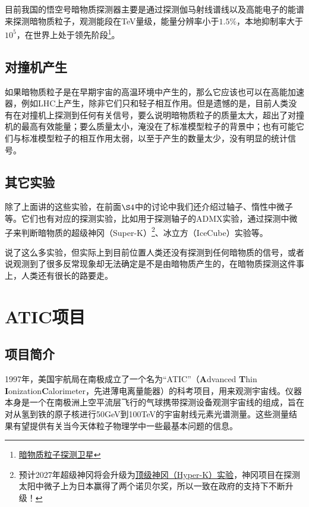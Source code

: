 \documentclass{ctexart}
\begin{document}
	目前我国的悟空号暗物质探测器主要是通过探测伽马射线谱线以及高能电子的能谱来探测暗物质粒子，观测能段在TeV量级，能量分辨率小于$1.5\%$，本地抑制率大于$10^5$，在世界上处于领先阶段\footnote{\href{http://pmo.cas.cn/dampe/}{暗物质粒子探测卫星}}。
	
	\subsection{对撞机产生}
	如果暗物质粒子是在早期宇宙的高温环境中产生的，那么它应该也可以在高能加速器，例如LHC上产生，除非它们只和轻子相互作用。但是遗憾的是，目前人类没有在对撞机上探测到任何有关信号，要么说明暗物质粒子的质量太大，超出了对撞机的最高有效能量；要么质量太小，淹没在了标准模型粒子的背景中；也有可能它们与标准模型粒子的相互作用太弱，以至于产生的数量太少，没有明显的统计信号。
	
	\subsection{其它实验}
	除了上面讲的这些实验，在前面$\S 4$中的讨论中我们还介绍过轴子、惰性中微子等。它们也有对应的探测实验，比如用于探测轴子的ADMX实验，通过探测中微子来判断暗物质的超级神冈（Super-K）\footnote{预计2027年超级神冈将会升级为\href{https://www-sk.icrr.u-tokyo.ac.jp/en/hk/}{顶级神冈（Hyper-K）实验}，神冈项目在探测太阳中微子上为日本赢得了两个诺贝尔奖，所以一致在政府的支持下不断升级！}\cite{Super-K}、冰立方（IceCube）\cite{IceCube}实验等。
	
	\hspace*{\fill}
	\noindent\makebox[\linewidth]{\rule{.5\paperwidth}{0.4pt}}
	\hspace*{\fill}
	
	说了这么多实验，但实际上到目前位置人类还没有探测到任何暗物质的信号，或者说观测到了很多反常现象却无法确定是不是由暗物质产生的，在暗物质探测这件事上，人类还有很长的路要走。
	
	\section{ATIC项目}
	\subsection{项目简介}
	1997年，美国宇航局在南极成立了一个名为“ATIC”（\textbf{A}dvanced \textbf{T}hin \textbf{I}onization\textbf{C}alorimeter，先进薄电离量能器）的科考项目，用来观测宇宙线。仪器本身是一个在南极洲上空平流层飞行的气球携带探测设备观测宇宙线的组成，旨在对从氢到铁的原子核进行50GeV到100TeV的宇宙射线元素光谱测量。这些测量结果有望提供有关当今天体粒子物理学中一些最基本问题的信息。
	
\end{document}
